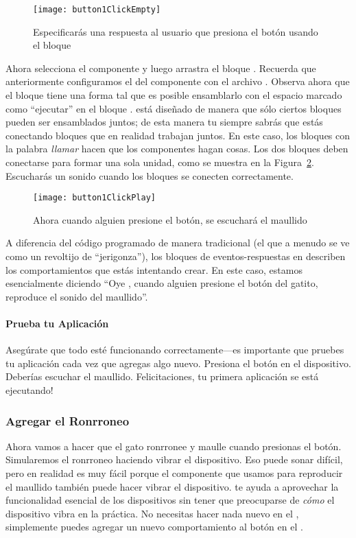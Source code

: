 \begin{figure}[H]
  \centering
  \texttt{[image: button1ClickEmpty]}
  \caption{Especificarás una respuesta al usuario que presiona el botón usando el bloque }
  \label{fig:button1ClickEmpty}
\end{figure}

Ahora selecciona el componente  y luego arrastra el bloque . Recuerda que anteriormente configuramos el  del componente con el archivo . Observa ahora que el bloque  tiene una forma tal que es posible ensamblarlo con el espacio marcado como ``ejecutar'' en el bloque . \AppInventor está diseñado de manera que sólo ciertos bloques pueden ser ensamblados juntos; de esta manera tu siempre sabrás que estás conectando bloques que en realidad trabajan juntos. En este caso, los bloques con la palabra \emph{llamar} hacen que los componentes hagan cosas. Los dos bloques deben conectarse para formar una sola unidad, como se muestra en la Figura~\ref{fig:button1ClickPlay}. Escucharás un sonido cuando los bloques se conecten correctamente.

\begin{figure}[H]
  \centering
  \texttt{[image: button1ClickPlay]}
  \caption{Ahora cuando alguien presione el botón, se escuchará el maullido}
  \label{fig:button1ClickPlay}
\end{figure}

A diferencia del código programado de manera tradicional (el que a menudo se ve como un revoltijo de ``jerigonza''), los bloques de eventos-respuestas en \AppInventor describen los comportamientos que estás intentando crear. En este caso, estamos esencialmente diciendo ``Oye \AppInventor, cuando alguien presione el botón del gatito, reproduce el sonido del maullido''.

\paragraph{Prueba tu Aplicación} Asegúrate que todo esté funcionando correctamente---es importante que pruebes tu aplicación cada vez que agregas algo nuevo. Presiona el botón en el dispositivo. Deberías escuchar el maullido. Felicitaciones, tu primera aplicación se está ejecutando!

\subsubsection*{Agregar el Ronrroneo}
Ahora vamos a hacer que el gato ronrronee y maulle cuando presionas el botón. Simularemos el ronrroneo haciendo vibrar el dispositivo. Eso puede sonar difícil, pero en realidad es muy fácil porque el componente  que usamos para reproducir el maullido también puede hacer vibrar el dispositivo. \AppInventor te ayuda a aprovechar la funcionalidad esencial de los dispositivos sin tener que preocuparse de \emph{cómo} el dispositivo vibra en la práctica. No necesitas hacer nada nuevo en el \designer, simplemente puedes agregar un nuevo comportamiento al botón en el \blockEditor.

